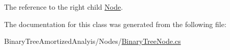 The reference to the right child \hyperlink{class_binary_tree_amortized_analyis_1_1_node}{Node}. 



The documentation for this class was generated from the following file\+:\begin{DoxyCompactItemize}
\item 
Binary\+Tree\+Amortized\+Analyis/\+Nodes/\hyperlink{_binary_tree_node_8cs}{Binary\+Tree\+Node.\+cs}\end{DoxyCompactItemize}
